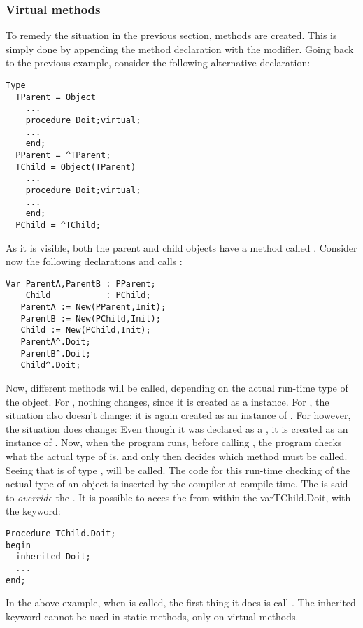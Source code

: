 \subsubsection{Virtual methods}
To remedy the situation in the previous section,  methods are
created. This is simply done by appending the method declaration with the
 modifier.
Going back to the previous example, consider the following alternative
declaration:
\begin{verbatim}
Type
  TParent = Object
    ...
    procedure Doit;virtual;
    ...
    end;
  PParent = ^TParent;
  TChild = Object(TParent)
    ...
    procedure Doit;virtual;
    ...
    end;
  PChild = ^TChild;
\end{verbatim}
As it is visible, both the parent and child objects have a method called
. Consider now the following declarations and calls :
\begin{verbatim}
Var ParentA,ParentB : PParent;
    Child           : PChild;
   ParentA := New(PParent,Init);
   ParentB := New(PChild,Init);
   Child := New(PChild,Init);
   ParentA^.Doit;
   ParentB^.Doit;
   Child^.Doit;
\end{verbatim}
Now, different methods will be called, depending on the actual run-time type
of the object. For , nothing changes, since it is created as
a  instance. For , the situation also doesn't
change: it is again created as an instance of .
For  however, the situation does change: Even though it was
declared as a , it is created as an instance of .
Now, when the program runs, before calling , the program
checks what the actual type of  is, and only then decides which
method must be called. Seeing that  is of type ,
 will be called.
The code for this run-time checking of the actual type of an object is
inserted by the compiler at compile time.
The  is said to {\em override} the .
It is possible to acces the  from within the
var{TChild.Doit}, with the  keyword:
\begin{verbatim}
Procedure TChild.Doit;
begin
  inherited Doit;
  ...
end;
\end{verbatim}
In the above example, when  is called, the first thing it
does is call .  The inherited keyword cannot be used in
static methods, only on virtual methods.
